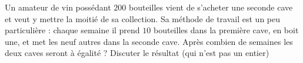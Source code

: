 
\begin{exercice}\label{exosmath-0625}

    Un amateur de vin possédant \( 200\) bouteilles vient de s'acheter une seconde cave et veut y mettre la moitié de sa collection. Sa méthode de travail est un peu particulière : chaque semaine il prend \( 10\) bouteilles dans la première cave, en boit une, et met les neuf autres dans la seconde cave. Après combien de semaines les deux caves seront à égalité ? Discuter le résultat (qui n'est pas un entier)

\end{exercice}
